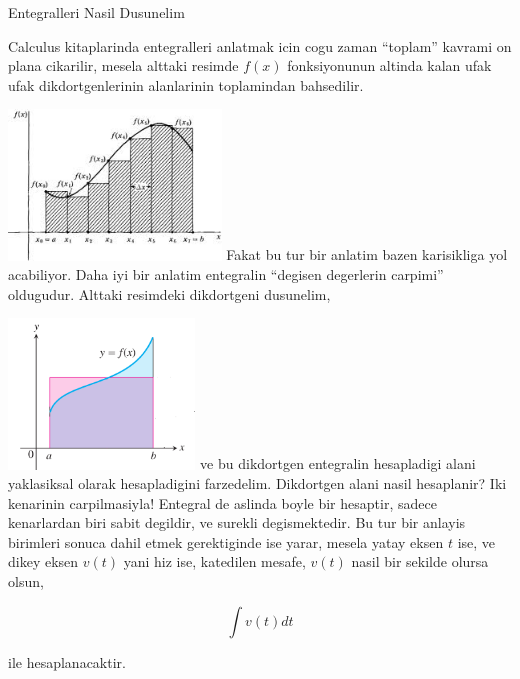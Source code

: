 \documentclass[12pt,fleqn]{article}
\begin{document}
Entegralleri Nasil Dusunelim

Calculus kitaplarinda entegralleri anlatmak icin cogu zaman ``toplam''
kavrami on plana cikarilir, mesela alttaki resimde $f(x)$ fonksiyonunun
altinda kalan ufak ufak dikdortgenlerinin alanlarinin toplamindan
bahsedilir. 

\includegraphics[height=4cm]{area.png}
Fakat bu tur bir anlatim bazen karisikliga yol acabiliyor. Daha iyi bir
anlatim entegralin ``degisen degerlerin carpimi'' oldugudur. Alttaki
resimdeki dikdortgeni dusunelim, 

\includegraphics[height=4cm]{box.png}
ve bu dikdortgen entegralin hesapladigi alani yaklasiksal olarak
hesapladigini farzedelim. Dikdortgen alani nasil hesaplanir? Iki kenarinin
carpilmasiyla! Entegral de aslinda boyle bir hesaptir, sadece kenarlardan
biri sabit degildir, ve surekli degismektedir. Bu tur bir anlayis birimleri
sonuca dahil etmek gerektiginde ise yarar, mesela yatay eksen $t$ ise, ve
dikey eksen $v(t)$ yani hiz ise, katedilen mesafe, $v(t)$ nasil bir sekilde
olursa olsun, 

\[ \int v(t)dt \]

ile hesaplanacaktir. 
\end{document}
